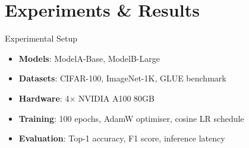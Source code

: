 \documentclass{beamer}
\begin{document}
\section[Results]{Experiments \& Results}

\begin{frame}{Experimental Setup}
    \begin{itemize}
        \setlength{\itemsep}{0.7em}
        \item \textcolor{AccentBlue}{\textbf{Models}}: ModelA-Base, ModelB-Large
        \item \textcolor{AccentBlue}{\textbf{Datasets}}: CIFAR-100, ImageNet-1K, GLUE benchmark
        \item \textcolor{AccentBlue}{\textbf{Hardware}}: 4\(\times\) NVIDIA A100 80GB
        \item \textcolor{AccentBlue}{\textbf{Training}}: 100 epochs, AdamW optimiser, cosine LR schedule
        \item \textcolor{AccentBlue}{\textbf{Evaluation}}: Top-1 accuracy, F1 score, inference latency
    \end{itemize}
\end{frame}
\end{document}
